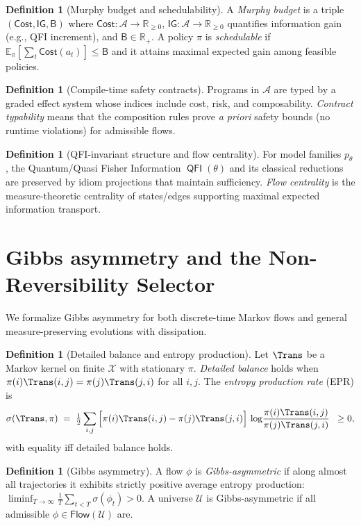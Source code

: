 \documentclass[11pt]{article}
\theoremstyle{plain}
\theoremstyle{definition}
\newtheorem{definition}[theorem]{Definition}
\theoremstyle{remark}
\DeclareMathOperator{\QFI}{\mathsf{QFI}}
\newcommand{\EE}{\mathbb{E}}
\newcommand{\RR}{\mathbb{R}}
\newcommand{\1}{\mathds{1}}
\newcommand{\Flows}{\mathsf{Flow}}
\newcommand{\U}{\mathcal{U}}
\newcommand{\X}{\mathcal{X}}
\newcommand{\A}{\mathcal{A}}
\newcommand{\Budget}{\mathsf{B}}
\newcommand{\Cost}{\mathsf{Cost}}
\newcommand{\Gain}{\mathsf{IG}}
\newcommand{\EP}{\sigma} %
\begin{document}
\begin{definition}[Murphy budget and schedulability]
A \emph{Murphy budget} is a triple $(\Cost,\Gain,\Budget)$ where $\Cost:\A\to\RR_{\ge0}$, $\Gain:\A\to\RR_{\ge0}$ quantifies information gain (e.g., QFI increment), and $\Budget\in\RR_{+}$.
A policy $\pi$ is \emph{schedulable} if $\EE_{\pi}[\sum_t \Cost(a_t)]\le\Budget$ and it attains maximal expected gain among feasible policies.
\end{definition}

\begin{definition}[Compile-time safety contracts]
Programs in $\A$ are typed by a graded effect system whose indices include cost, risk, and composability. \emph{Contract typability} means that the composition rules prove \emph{a priori} safety bounds (no runtime violations) for admissible flows.
\end{definition}

\begin{definition}[QFI-invariant structure and flow centrality]
For model families $p_\theta$, the Quantum/Quasi Fisher Information $\QFI(\theta)$ and its classical reductions are preserved by idiom projections that maintain sufficiency. \emph{Flow centrality} is the measure-theoretic centrality of states/edges supporting maximal expected information transport.
\end{definition}

\section{Gibbs asymmetry and the Non-Reversibility Selector}
We formalize Gibbs asymmetry for both discrete-time Markov flows and general measure-preserving evolutions with dissipation.

\begin{definition}[Detailed balance and entropy production]
Let $\Trans$ be a Markov kernel on finite $\X$ with stationary $\pi$.
\emph{Detailed balance} holds when $\pi(i)\Trans(i,j)=\pi(j)\Trans(j,i)$ for all $i,j$.
The \emph{entropy production rate} (EPR) is
\begin{equation}
\label{eq:epr}
\EP(\Trans,\pi)\;=\;\tfrac12 \sum_{i,j} \Big[\pi(i)\Trans(i,j)-\pi(j)\Trans(j,i)\Big]\,
\log\!\frac{\pi(i)\Trans(i,j)}{\pi(j)\Trans(j,i)} \;\;\ge 0,
\end{equation}
with equality iff detailed balance holds.
\end{definition}

\begin{definition}[Gibbs asymmetry]
A flow $\phi$ is \emph{Gibbs-asymmetric} if along almost all trajectories it exhibits strictly positive average entropy production: $\liminf_{T\to\infty}\tfrac1T\sum_{t<T}\EP(\phi_t)>0$. A universe $\U$ is Gibbs-asymmetric if all admissible $\phi\in\Flows(\U)$ are.
\end{definition}
\end{document}
